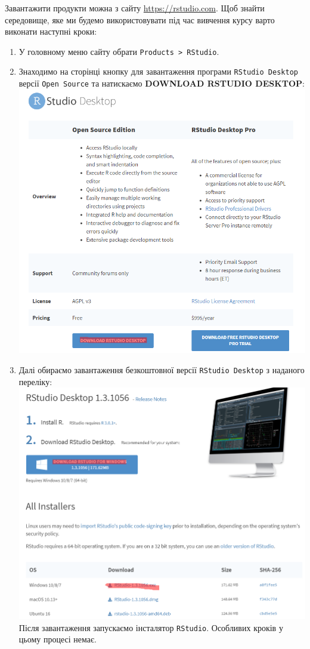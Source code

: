 \documentclass[
]{book}
\providecommand{\tightlist}{%
  \setlength{\itemsep}{0pt}\setlength{\parskip}{0pt}}
\begin{document}
Завантажити продукти можна з сайту \url{https://rstudio.com}. Щоб знайти середовище, яке ми будемо використовувати під час вивчення курсу варто виконати наступні кроки:

\begin{enumerate}
\def\labelenumi{\arabic{enumi}.}
\tightlist
\item
  У головному меню сайту обрати \texttt{Products\ \textgreater{}\ RStudio}.
\item
  Знаходимо на сторінці кнопку для завантаження програми \texttt{RStudio\ Desktop} версії \texttt{Open\ Source} та натискаємо \textbf{DOWNLOAD RSTUDIO DESKTOP}:
  \includegraphics{images/chapter1/rstudio_1.png}
\item
  Далі обираємо завантаження безкоштовної версії \texttt{RStudio\ Desktop} з наданого переліку:
  \includegraphics{images/chapter1/rstudio_2.png}
  Після завантаження запускаємо інсталятор \texttt{RStudio}. Особливих кроків у цьому процесі немає.
\end{enumerate}
\end{document}
